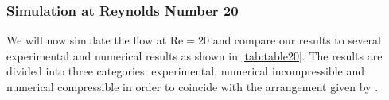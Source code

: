 %
	
	\subsubsection{Simulation at Reynolds Number 20}
	We will now simulate the flow at $\text{Re}=20$ and compare our results to several experimental and numerical results as shown in \ref{tab:table20}. The results are divided into three categories: experimental, numerical incompressible and numerical compressible in order to coincide with the arrangement given by \cite{ayers}.

